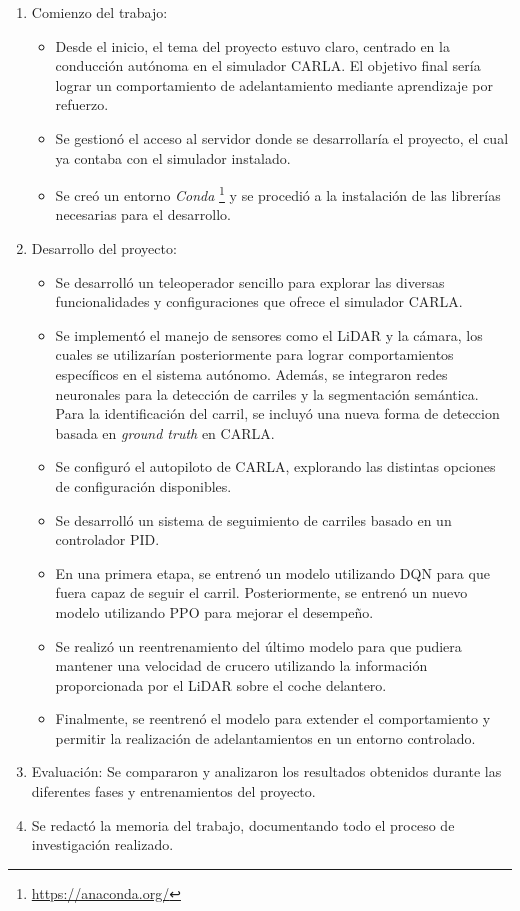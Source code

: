 \begin{enumerate}
    \item Comienzo del trabajo:
	\begin{itemize}
		\item Desde el inicio, el tema del proyecto estuvo claro, centrado en la conducción autónoma en el simulador CARLA. El objetivo final sería lograr un comportamiento de adelantamiento mediante aprendizaje por refuerzo.
		\item Se gestionó el acceso al servidor donde se desarrollaría el proyecto, el cual ya contaba con el simulador instalado.	
		\item Se creó un entorno \textit{Conda} \footnote{\url{https://anaconda.org/}} y se procedió a la instalación de las librerías necesarias para el desarrollo.
	\end{itemize}

    \item Desarrollo del proyecto:
	\begin{itemize}
		\item Se desarrolló un teleoperador sencillo para explorar las diversas funcionalidades y configuraciones que ofrece el simulador CARLA.
		\item Se implementó el manejo de sensores como el \ac{LiDAR} y la cámara, los cuales se utilizarían posteriormente para lograr comportamientos específicos en el sistema autónomo. Además, se integraron redes neuronales para la detección de carriles y la segmentación semántica. Para la identificación del carril, se incluyó una nueva forma de deteccion basada en  \textit{ground truth} en CARLA.	
		\item Se configuró el autopiloto de CARLA, explorando las distintas opciones de configuración disponibles.
		\item Se desarrolló un sistema de seguimiento de carriles basado en un controlador \ac{PID}.
		\item En una primera etapa, se entrenó un modelo utilizando \ac{DQN} para que fuera capaz de seguir el carril. Posteriormente, se entrenó un nuevo modelo utilizando \ac{PPO} para mejorar el desempeño.
		\item Se realizó un reentrenamiento del último modelo para que pudiera mantener una velocidad de crucero utilizando la información proporcionada por el \ac{LiDAR} sobre el coche delantero.
		\item Finalmente, se reentrenó el modelo para extender el comportamiento y permitir la realización de adelantamientos en un entorno controlado.
	\end{itemize}

    \item Evaluación: Se compararon y analizaron los resultados obtenidos durante las diferentes fases y entrenamientos del proyecto.
    \item Se redactó la memoria del trabajo, documentando todo el proceso de investigación realizado.
\end{enumerate}

